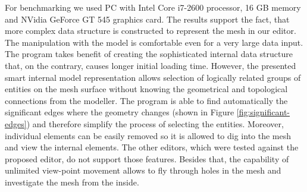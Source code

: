 For benchmarking we used PC with Intel Core i7-2600 processor, 16 GB memory and NVidia GeForce GT 545 graphics card. The results support the fact, that more complex data structure is constructed to represent the mesh in our editor. The manipulation with the model is comfortable even for a very large data input. The program takes benefit of creating the sophisticated internal data structure that, on the contrary, causes longer initial loading time. However, the presented smart internal model representation allows selection of logically related groups of entities on the mesh surface without knowing the geometrical and topological connections from the modeller. The program is able to find automatically the significant edges where the geometry changes (shown in Figure \ref{fig:significant-edges}) and therefore simplify the process of selecting the entities. Moreover, individual elements can be easily removed so it is allowed to dig into the mesh and view the internal elements. The other editors, which were tested against the proposed editor, do not support those features. Besides that, the capability of unlimited view-point movement allows to fly through holes in the mesh and investigate the mesh from the inside.